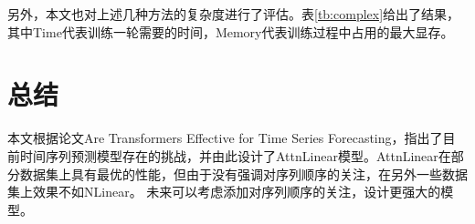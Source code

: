 \documentclass{article}
\begin{document}
另外，本文也对上述几种方法的复杂度进行了评估。表\ref{tb:complex}给出了结果，其中Time代表训练一轮需要的时间，Memory代表训练过程中占用的最大显存。

\section{总结}
本文根据论文Are Transformers Effective for Time Series Forecasting，指出了目前时间序列预测模型存在的挑战，并由此设计了AttnLinear模型。AttnLinear在部分数据集上具有最优的性能，但由于没有强调对序列顺序的关注，在另外一些数据集上效果不如NLinear。
未来可以考虑添加对序列顺序的关注，设计更强大的模型。
\end{document}
